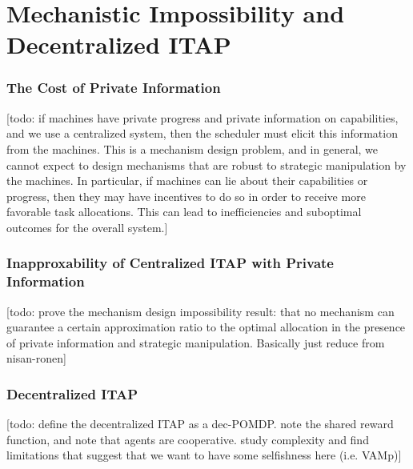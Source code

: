 \chapter{Mechanistic Impossibility and Decentralized ITAP}\label{chap:decentralized}

\subsection{The Cost of Private Information}

[todo: if machines have private progress and private information on capabilities, and we use a centralized system, then the scheduler must elicit this information from the machines. This is a mechanism design problem, and in general, we cannot expect to design mechanisms that are robust to strategic manipulation by the machines. In particular, if machines can lie about their capabilities or progress, then they may have incentives to do so in order to receive more favorable task allocations. This can lead to inefficiencies and suboptimal outcomes for the overall system.]

\subsection{Inapproxability of Centralized ITAP with Private Information}

[todo: prove the mechanism design impossibility result: that no mechanism can guarantee a certain approximation ratio to the optimal allocation in the presence of private information and strategic manipulation. Basically just reduce from nisan-ronen]

\subsection{Decentralized ITAP}

[todo: define the decentralized ITAP as a dec-POMDP. note the shared reward function, and note that agents are cooperative. study complexity and find limitations that suggest that we want to have some selfishness here (i.e. VAMp)]